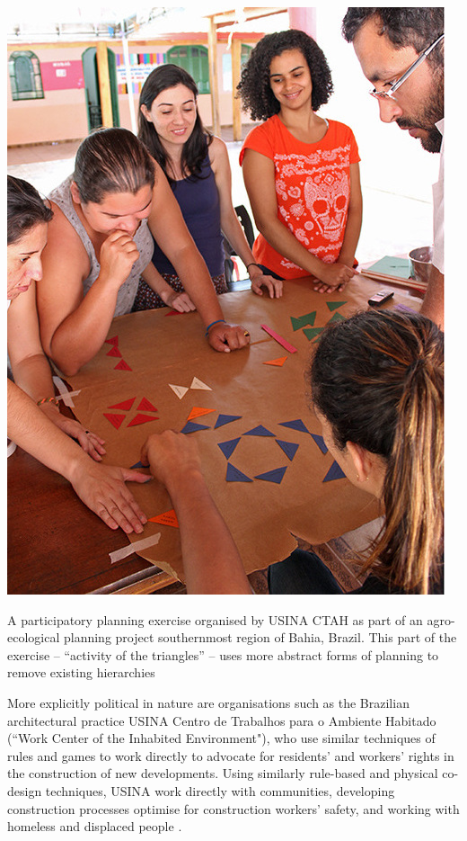\documentclass[nofonts,nols,justified,nobib]{tufte-book}
\begin{document}
\begin{marginfigure}
\includegraphics[width=\textwidth]{img/1/usina-triangles.jpg}
\caption{A participatory planning exercise organised by USINA CTAH as part of an agro-ecological planning project southernmost region of Bahia, Brazil. This part of the exercise -- ``activity of the triangles'' -- uses more abstract forms of planning to remove existing hierarchies  \cite{noauthor_usina_ctah_nodate}}
\end{marginfigure}

More explicitly political in nature are organisations such as the Brazilian architectural practice USINA Centro de Trabalhos para o Ambiente Habitado (``Work Center of the Inhabited Environment"), who use similar techniques of rules and games to work directly to advocate for residents' and workers' rights in the construction of new developments. Using similarly rule-based and physical co-design techniques, USINA work directly with communities, developing construction processes optimise for construction workers' safety, and working with homeless and displaced people \cite{noauthor_usina_ctah_nodate}.
\end{document}
